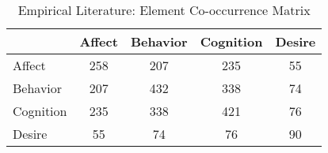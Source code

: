 \begin{table}
\begin{minipage}[t][\textheight][t]{\textwidth}

\caption{\label{tab:EmpiricalElementCooccurrences}Empirical Literature: Element Co-occurrence Matrix}
\begin{tabular}[t]{lcccc}
\toprule
  & Affect & Behavior & Cognition & Desire\\
\midrule
Affect & 258 & 207 & 235 & 55\\
Behavior & 207 & 432 & 338 & 74\\
Cognition & 235 & 338 & 421 & 76\\
Desire & 55 & 74 & 76 & 90\\
\bottomrule
\end{tabular}
\end{minipage}
\end{table}
